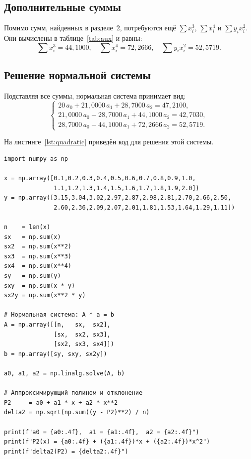 \documentclass[a4paper, final]{article}
\begin{document}
\subsection{Дополнительные суммы}

Помимо сумм, найденных в разделе~2, потребуются ещё $\sum x_i^3$, $\sum x_i^4$ и
$\sum y_i x_i^2$. Они вычислены в таблице~\ref{tab:aux} и равны:
\[
\sum x_i^3 = 44{,}1000, \quad \sum x_i^4 = 72{,}2666, \quad
\sum y_i x_i^2 = 52{,}5719.
\]

\subsection{Решение нормальной системы}

Подставляя все суммы, нормальная система принимает вид:
\[
\begin{cases}
20\,a_0 + 21{,}0000\,a_1 + 28{,}7000\,a_2 = 47{,}2100, \\
21{,}0000\,a_0 + 28{,}7000\,a_1 + 44{,}1000\,a_2 = 42{,}7030, \\
28{,}7000\,a_0 + 44{,}1000\,a_1 + 72{,}2666\,a_2 = 52{,}5719.
\end{cases}
\]

На листинге~\ref{lst:quadratic} приведён код для решения этой системы.

\begin{lstlisting}[caption={Квадратичная аппроксимация МНК}, label=lst:quadratic]
import numpy as np

x = np.array([0.1,0.2,0.3,0.4,0.5,0.6,0.7,0.8,0.9,1.0,
              1.1,1.2,1.3,1.4,1.5,1.6,1.7,1.8,1.9,2.0])
y = np.array([3.15,3.04,3.02,2.97,2.87,2.98,2.81,2.70,2.66,2.50,
              2.60,2.36,2.09,2.07,2.01,1.81,1.53,1.64,1.29,1.11])

n    = len(x)
sx   = np.sum(x)
sx2  = np.sum(x**2)
sx3  = np.sum(x**3)
sx4  = np.sum(x**4)
sy   = np.sum(y)
sxy  = np.sum(x * y)
sx2y = np.sum(x**2 * y)

# Нормальная система: A * a = b
A = np.array([[n,   sx,  sx2],
              [sx,  sx2, sx3],
              [sx2, sx3, sx4]])
b = np.array([sy, sxy, sx2y])

a0, a1, a2 = np.linalg.solve(A, b)

# Аппроксимирующий полином и отклонение
P2     = a0 + a1 * x + a2 * x**2
delta2 = np.sqrt(np.sum((y - P2)**2) / n)

print(f"a0 = {a0:.4f},  a1 = {a1:.4f},  a2 = {a2:.4f}")
print(f"P2(x) = {a0:.4f} + ({a1:.4f})*x + ({a2:.4f})*x^2")
print(f"delta2(P2) = {delta2:.4f}")
\end{lstlisting}
\end{document}
